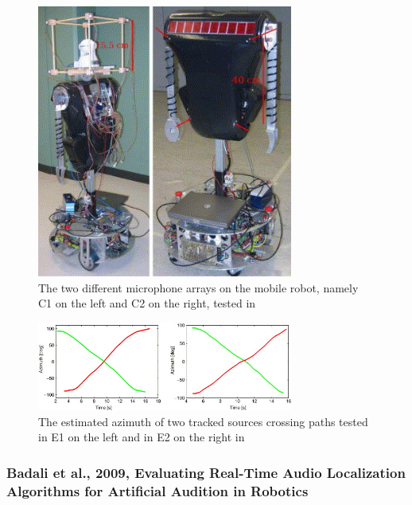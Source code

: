 \documentclass{report}
\begin{document}
\begin{figure}[H]
\includegraphics[width=0.75\textwidth]{./valin_2007/array.jpg}
\centering
\caption{The two different microphone arrays on the mobile robot, namely C1 on the left and C2 on the right, tested in \cite{valin_robust_2007}}
\label{fig:valin_2007_array}
\centering
\end{figure}

\begin{figure}[H]
\includegraphics[width=0.75\textwidth]{./valin_2007/track.jpg}
\centering
\caption{The estimated azimuth of two tracked sources crossing paths tested in E1 on the left and in E2 on the right in \cite{valin_robust_2007}}
\label{fig:valin_2007_track}
\centering
\end{figure}

\subsubsection{Badali et al., 2009, Evaluating Real-Time Audio Localization Algorithms for Artificial Audition in Robotics}
\end{document}
